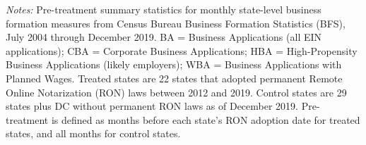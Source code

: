 \begin{table}[t]
\centering
\caption{Summary Statistics: Pre-Treatment Business Formation}
\label{tab:summary}
\small
{}
\par\vspace{0.3em}
{\footnotesize \textit{Notes:} Pre-treatment summary statistics for monthly state-level business formation measures from Census Bureau Business Formation Statistics (BFS), July 2004 through December 2019. BA = Business Applications (all EIN applications); CBA = Corporate Business Applications; HBA = High-Propensity Business Applications (likely employers); WBA = Business Applications with Planned Wages. Treated states are 22 states that adopted permanent Remote Online Notarization (RON) laws between 2012 and 2019. Control states are 29 states plus DC without permanent RON laws as of December 2019. Pre-treatment is defined as months before each state's RON adoption date for treated states, and all months for control states.}
\end{table}
